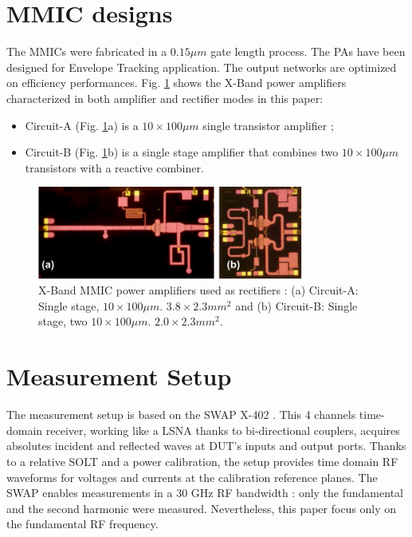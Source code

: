 \documentclass[conference]{IEEEtran}
\begin{document}

\section{MMIC designs}

The MMICs were fabricated in a $0.15\mu m$ gate length process. The PAs have been designed for Envelope Tracking application. The output networks are optimized on efficiency performances.
Fig. \ref{picture} shows the X-Band power amplifiers characterized in both amplifier and rectifier modes in this paper:
\begin{itemize}
\item Circuit-A (Fig. \ref{picture}a) is a $10\times100\mu m$ single transistor amplifier ;
\item Circuit-B (Fig. \ref{picture}b) is a single stage amplifier that combines two $10\times100\mu m$ transistors with a reactive combiner.
\end{itemize}

\begin{figure}[ht!] %
\centering
\includegraphics[width=3.45in]{IMS2014_Pictures_PA.png}
\caption{ X-Band MMIC power amplifiers used as rectifiers : (a) Circuit-A: Single stage, $10\times100\mu m$. $3.8\times2.3mm^2$ and (b) Circuit-B: Single stage, two $10\times100\mu m$. $2.0\times2.3mm^2$.}
\label{picture}
\end{figure}



\section{Measurement Setup}
The measurement setup is based on the SWAP X-402 \cite{Verspecht2010,Roblin2011}. This 4 channels time-domain receiver, working like a LSNA \cite{Verspecht2005} thanks to bi-directional couplers, acquires absolutes incident and reflected waves at DUT's inputs and output ports. Thanks to a relative SOLT and a power calibration, the setup provides time domain RF waveforms for voltages and currents at the calibration reference planes. The SWAP enables measurements in a $30$ GHz RF bandwidth : only the fundamental and the second harmonic were measured. Nevertheless, this paper focus only on the fundamental RF frequency.
\end{document}
